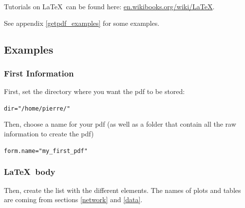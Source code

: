 \documentclass{article}\usepackage[]{graphicx}\usepackage[]{color}
\makeatletter
\newcommand{\hlstr}[1]{\textcolor[rgb]{0.192,0.494,0.8}{#1}}%
\newcommand{\hlstd}[1]{\textcolor[rgb]{0.345,0.345,0.345}{#1}}%
\newcommand{\hlkwb}[1]{\textcolor[rgb]{0.69,0.353,0.396}{#1}}%
\newenvironment{kframe}{%
 \def\at@end@of@kframe{}%
 \ifinner\ifhmode%
  \def\at@end@of@kframe{\end{minipage}}%
  \begin{minipage}{\columnwidth}%
 \fi\fi%
 \def\FrameCommand##1{\hskip\@totalleftmargin \hskip-\fboxsep
 \colorbox{shadecolor}{##1}\hskip-\fboxsep
     \hskip-\linewidth \hskip-\@totalleftmargin \hskip\columnwidth}%
 \MakeFramed {\advance\hsize-\width
   \@totalleftmargin\z@ \linewidth\hsize
   \@setminipage}}%
 {\par\unskip\endMakeFramed%
 \at@end@of@kframe}
\newenvironment{knitrout}{}{} %
\makeatother
\begin{document}
Tutorials on \LaTeX~can be found here: \url{en.wikibooks.org/wiki/LaTeX}.

See appendix \ref{getpdf_examples} for some examples.

\subsection{Examples}

\subsubsection{First Information}
First, set the directory where you want the pdf to be stored:
\begin{knitrout}
\color{fgcolor}\begin{kframe}
\begin{alltt}
\hlstd{dir} \hlkwb{=} \hlstr{"/home/pierre/"}
\end{alltt}
\end{kframe}
\end{knitrout}

Then, choose a name for your pdf (as well as a folder that contain all the raw information to create the pdf) 
\begin{knitrout}
\color{fgcolor}\begin{kframe}
\begin{alltt}
\hlstd{form.name} \hlkwb{=} \hlstr{"my_first_pdf"}
\end{alltt}
\end{kframe}
\end{knitrout}

\subsubsection{\LaTeX~body}

Then, create the list with the different elements.
The names of plots and tables are coming from sections \ref{network} and \ref{data}.
\end{document}

